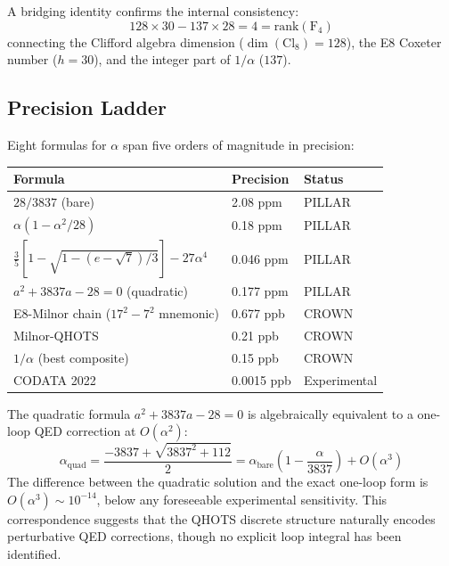 \documentclass[aps,prd,twocolumn,superscriptaddress,floatfix,nofootinbib]{revtex4-2}
\theoremstyle{definition}
\theoremstyle{remark}
\begin{document}
\noindent
A bridging identity confirms the internal consistency:
\begin{equation}
    128 \times 30 - 137 \times 28 = 4 = \text{rank}(\text{F}_4)
\end{equation}
connecting the Clifford algebra dimension ($\dim(\text{Cl}_8) = 128$), the E8
Coxeter number ($h = 30$), and the integer part of $1/\alpha$ ($137$).

\subsection{Precision Ladder}

Eight formulas for $\alpha$ span five orders of magnitude in precision:

\begin{center}
\begin{tabular}{lll}
\toprule
Formula & Precision & Status \\
\midrule
$28/3837$ (bare) & 2.08 ppm & PILLAR \\
$\alpha(1 - \alpha^2/28)$ & 0.18 ppm & PILLAR \\
$\frac{3}{5}[1 - \sqrt{1 - (e-\sqrt{7})/3}] - 27\alpha^4$ & 0.046 ppm & PILLAR \\
$a^2 + 3837a - 28 = 0$ (quadratic) & 0.177 ppm & PILLAR \\
E8-Milnor chain ($17^2{-}7^2$ mnemonic) & 0.677 ppb & CROWN \\
Milnor-QHOTS & 0.21 ppb & CROWN \\
$1/\alpha$ (best composite) & 0.15 ppb & CROWN \\
CODATA 2022 & 0.0015 ppb & Experimental \\
\bottomrule
\end{tabular}
\end{center}

\noindent
The quadratic formula $a^2 + 3837a - 28 = 0$ is algebraically equivalent to a
one-loop QED correction at $O(\alpha^2)$:
\begin{equation}
    \alpha_{\text{quad}} = \frac{-3837 + \sqrt{3837^2 + 112}}{2}
    = \alpha_{\text{bare}} \left(1 - \frac{\alpha}{3837}\right) + O(\alpha^3)
\end{equation}
The difference between the quadratic solution and the exact one-loop form is
$O(\alpha^3) \sim 10^{-14}$, below any foreseeable experimental sensitivity.
This correspondence suggests that the QHOTS discrete structure naturally encodes
perturbative QED corrections, though no explicit loop integral has been
identified.
\end{document}
